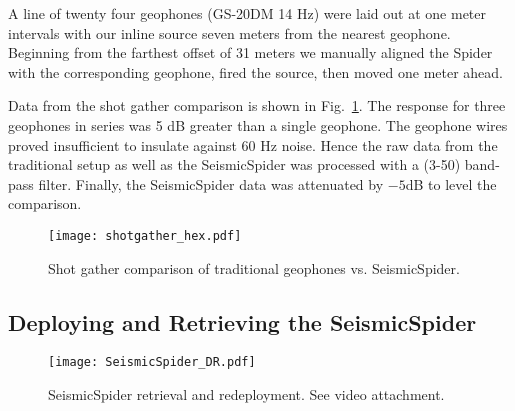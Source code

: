 A line of twenty four geophones (GS-20DM 14 Hz) were laid out at one meter intervals with our inline source seven meters from the nearest geophone. Beginning from the farthest offset of 31 meters we manually aligned the Spider with the corresponding geophone, fired the source, then moved one meter ahead. 

Data from the shot gather comparison is shown in Fig.~\ref{fig:shotgatherHexpod}.
The response for three geophones in series was 5 dB greater than a single geophone. The geophone wires proved insufficient to insulate against 60 Hz noise. Hence the raw data from the traditional setup as well as the SeismicSpider was processed with a (3-50) band-pass filter. Finally, the SeismicSpider data was attenuated by $-5$dB to level the comparison.    

\begin{figure} \centering
  \texttt{[image: shotgather\_hex.pdf]}
 \caption{Shot gather comparison of traditional geophones vs. SeismicSpider. 
 \label{fig:shotgatherHexpod}}
\end{figure}



\subsection{Deploying and Retrieving the SeismicSpider}

\begin{figure} \centering
  \texttt{[image: SeismicSpider\_DR.pdf]}
 \caption{SeismicSpider retrieval and redeployment. See video attachment. 
 \label{fig:SeismicSpiderDR}}
\end{figure}

